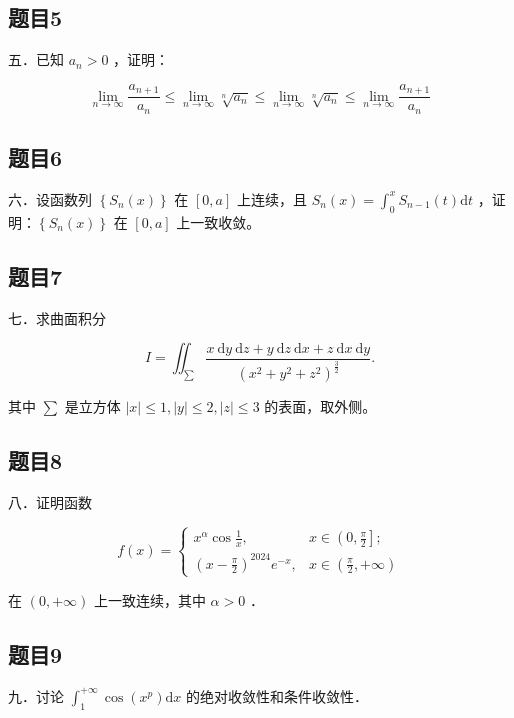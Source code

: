 \documentclass{article}
\begin{document}
\subsection{题目5}
五．已知 \(a_{n}>0\) ，证明：

\[
\lim _{n \rightarrow \infty} \frac{a_{n+1}}{a_{n}} \leq \lim _{n \rightarrow \infty} \sqrt[n]{a_{n}} \leq \lim _{n \rightarrow \infty} \sqrt[n]{a_{n}} \leq \lim _{n \rightarrow \infty} \frac{a_{n+1}}{a_{n}}
\]

\subsection{题目6}
六．设函数列 \(\left\{S_{n}(x)\right\}\) 在 \([0, a]\) 上连续，且 \(S_{n}(x)=\int_{0}^{x} S_{n-1}(t) \mathrm{d} t\) ，证明：\(\left\{S_{n}(x)\right\}\) 在 \([0, a]\) 上一致收敛。

\subsection{题目7}
七．求曲面积分

\[
I=\iint_{\sum} \frac{x \mathrm{~d} y \mathrm{~d} z+y \mathrm{~d} z \mathrm{~d} x+z \mathrm{~d} x \mathrm{~d} y}{\left(x^{2}+y^{2}+z^{2}\right)^{\frac{3}{2}}} .
\]

其中 \(\sum\) 是立方体 \(|x| \leq 1,|y| \leq 2,|z| \leq 3\) 的表面，取外侧。

\subsection{题目8}
八．证明函数

\[
f(x)= \begin{cases}x^{\alpha} \cos \frac{1}{x}, & x \in\left(0, \frac{\pi}{2}\right] ; \\ \left(x-\frac{\pi}{2}\right)^{2024} e^{-x}, & x \in\left(\frac{\pi}{2},+\infty\right)\end{cases}
\]

在 \((0,+\infty)\) 上一致连续，其中 \(\alpha>0\) ．

\subsection{题目9}
九．讨论 \(\int_{1}^{+\infty} \cos \left(x^{p}\right) \mathrm{d} x\) 的绝对收敛性和条件收敛性．
\end{document}
